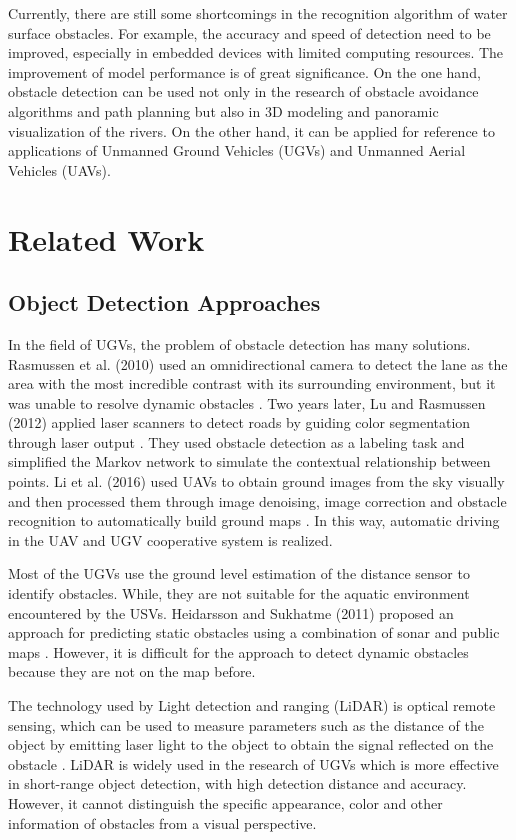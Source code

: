\documentclass[sensors,article,submit,moreauthors,pdftex]{Definitions/mdpi}
\begin{document}
Currently, there are still some shortcomings in the recognition algorithm of water surface obstacles. For example, the accuracy and speed of detection need to be improved, especially in embedded devices with limited computing resources. The improvement of model performance is of great significance. On the one hand, obstacle detection can be used not only in the research of obstacle avoidance algorithms and path planning but also in 3D modeling and panoramic visualization of the rivers. On the other hand, it can be applied for reference to applications of Unmanned Ground Vehicles (UGVs) and Unmanned Aerial Vehicles (UAVs).


 \section{Related Work}


\subsection{Object Detection Approaches}

In the field of UGVs, the problem of obstacle detection has many solutions. Rasmussen et al. (2010) used an omnidirectional camera to detect the lane as the area with the most incredible contrast with its surrounding environment, but it was unable to resolve dynamic obstacles \cite{5650189}. Two years later, Lu and Rasmussen (2012) applied laser scanners to detect roads by guiding color segmentation through laser output \cite{6386039}. They used obstacle detection as a labeling task and simplified the Markov network to simulate the contextual relationship between points. Li et al. (2016) used UAVs to obtain ground images from the sky visually and then processed them through image denoising, image correction and obstacle recognition to automatically build ground maps  \cite{li2016hybrid}. In this way, automatic driving in the UAV and UGV cooperative system is realized.

Most of the UGVs use the ground level estimation of the distance sensor to identify obstacles. While, they are not suitable for the aquatic environment encountered by the USVs. Heidarsson and Sukhatme (2011) proposed an approach for predicting static obstacles using a combination of sonar and public maps \cite{5980509}. However, it is difficult for the approach to detect dynamic obstacles because they are not on the map before.

The technology used by Light detection and ranging (LiDAR) is optical remote sensing, which can be used to measure parameters such as the distance of the object by emitting laser light to the object to obtain the signal reflected on the obstacle \cite {larson2011lidar}. LiDAR is widely used in the research of UGVs which is more effective in short-range object detection, with high detection distance and accuracy. However, it cannot distinguish the specific appearance, color and other information of obstacles from a visual perspective. 
\end{document}
